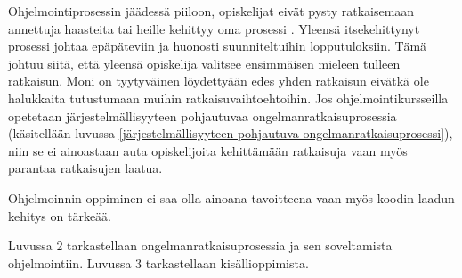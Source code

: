 Ohjelmointiprosessin jäädessä piiloon, opiskelijat eivät pysty ratkaisemaan
annettuja haasteita tai heille kehittyy oma prosessi
\cite{Caspersen:2006:NPO:1176617.1176741}. Yleensä itsekehittynyt prosessi
johtaa epäpäteviin ja huonosti suunniteltuihin lopputuloksiin. Tämä johtuu
siitä, että yleensä opiskelija valitsee ensimmäisen mieleen tulleen ratkaisun.
Moni on tyytyväinen löydettyään edes yhden ratkaisun eivätkä ole halukkaita
tutustumaan muihin ratkaisuvaihtoehtoihin. Jos ohjelmointikursseilla opetetaan
järjestelmällisyyteen pohjautuvaa ongelmanratkaisuprosessia
(käsitellään luvussa \ref{järjestelmällisyyteen pohjautuva
ongelmanratkaisuprosessi}), niin se ei ainoastaan auta opiskelijoita kehittämään
ratkaisuja vaan myös parantaa ratkaisujen laatua.

Ohjelmoinnin oppiminen ei saa olla ainoana tavoitteena vaan myös koodin laadun
kehitys on tärkeää.

Luvussa 2 tarkastellaan ongelmanratkaisuprosessia ja sen soveltamista
ohjelmointiin. Luvussa 3 tarkastellaan kisällioppimista.
